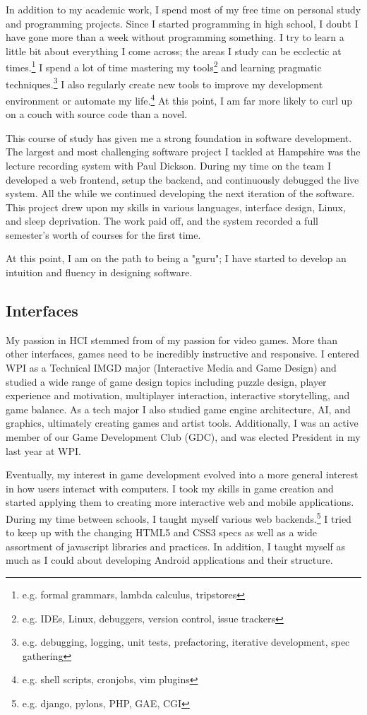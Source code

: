In addition to my academic work, I spend most of my free time on
personal study and programming projects. Since I started programming in
high school, I doubt I have gone more than a week without programming
something. I try to learn a little bit about everything I come across;
the areas I study can be ecclectic at times.\footnote{e.g. formal grammars,
lambda calculus, tripstores} I spend a lot of time mastering my
tools\footnote{e.g. IDEs, Linux, debuggers, version control, issue trackers} and
learning pragmatic techniques.\footnote{e.g. debugging, logging, unit tests, prefactoring,
iterative development, spec gathering} I also
regularly create new tools to improve my development environment or
automate my life.\footnote{e.g. shell scripts, cronjobs, vim plugins} At this
point, I am far more likely to curl up on a couch with source code than
a novel.

This course of study has given me a strong foundation in software
development. The largest and most challenging software project I tackled
at Hampshire was the lecture recording system with Paul Dickson. During
my time on the team I developed a web frontend, setup the backend,
and continuously debugged the live system. All the while we continued
developing the next iteration of the software. This project drew upon
my skills in various languages, interface design, Linux, and sleep
deprivation. The work paid off, and the system recorded a full semester's
worth of courses for the first time.

At this point, I am on the path to being a "guru"; I have started to
develop an intuition and fluency in designing software.


\subsection*{Interfaces}
My passion in HCI stemmed from of my passion for video games. More
than other interfaces, games need to be incredibly instructive and
responsive. I entered WPI as a Technical IMGD major (Interactive
Media and Game Design) and studied a wide range of game design topics
including puzzle design, player experience and motivation, multiplayer
interaction, interactive storytelling, and game balance. As a tech major
I also studied game engine architecture, AI, and graphics, ultimately
creating games and artist tools. Additionally, I was an active member of
our Game Development Club (GDC), and was elected President in my last
year at WPI.

Eventually, my interest in game development evolved into a more general
interest in how users interact with computers. I took my skills in game
creation and started applying them to creating more interactive web and
mobile applications. During my time between schools, I taught myself
various web backends.\footnote{e.g. django, pylons, PHP, GAE, CGI} I tried
to keep up with the changing HTML5 and CSS3 specs as well as a wide
assortment of javascript libraries and practices. In addition, I taught
myself as much as I could about developing Android applications and
their structure.

